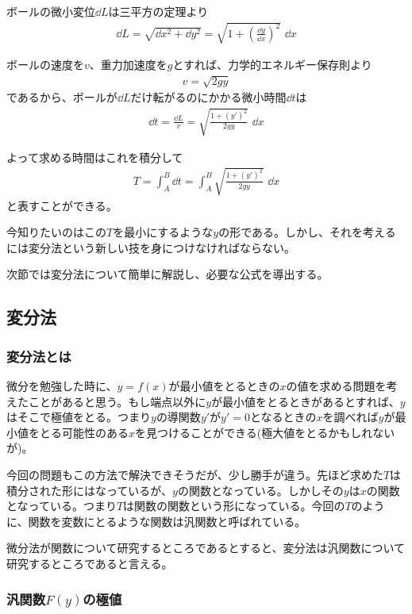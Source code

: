 ボールの微小変位$\dd L$は三平方の定理より
\begin{align*}
  \dd L = \sqrt{\dd x^2 + \dd y^2}
        = \sqrt{1 + \left( \frac{\dd y}{\dd x} \right)^2} \,\,\dd x
\end{align*}\par
ボールの速度を$v$、重力加速度を$g$とすれば、力学的エネルギー保存則より
\begin{align*}
  v = \sqrt{2gy}
\end{align*}
であるから、ボールが$\dd L$だけ転がるのにかかる微小時間$\dd t$は
\begin{align*}
  \dd t = \frac{\dd L}{v} = \sqrt{\frac{1 + (y')^2}{2gy}} \,\,\dd x
\end{align*}\par
よって求める時間はこれを積分して
\begin{align*}
  T = \int_A^B \dd t = \int_A^B \sqrt{\frac{1 + (y')^2}{2gy}} \,\,\dd x
\end{align*}
と表すことができる。\par
今知りたいのはこの$T$を最小にするような$y$の形である。しかし、それを考えるには変分法という新しい技を身につけなければならない。\par
次節では変分法について簡単に解説し、必要な公式を導出する。

\subsection{変分法}

\subsubsection{変分法とは}
微分を勉強した時に、$y = f(x)$が最小値をとるときの$x$の値を求める問題を考えたことがあると思う。もし端点以外に$y$が最小値をとるときがあるとすれば、$y$はそこで極値をとる。つまり$y$の導関数$y'$が$y' = 0$となるときの$x$を調べれば$y$が最小値をとる可能性のある$x$を見つけることができる(極大値をとるかもしれないが)。\par
今回の問題もこの方法で解決できそうだが、少し勝手が違う。先ほど求めた$T$は積分された形にはなっているが、$y$の関数となっている。しかしその$y$は$x$の関数となっている。つまり$T$は関数の関数という形になっている。今回の$T$のように、関数を変数にとるような関数は汎関数と呼ばれている。\par
微分法が関数について研究するところであるとすると、変分法は汎関数について研究するところであると言える。

\subsubsection{汎関数$F(y)$の極値}

